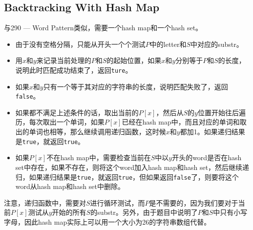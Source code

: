 \subsection{Backtracking With Hash Map}
与290 --- Word Pattern类似，需要一个hash map和一个hash set。
\begin{itemize}
\item 由于没有空格分隔，只能从开头一个个测试$P$中的letter和$S$中对应的substr。
\item 用$x$和$y$来记录当前处理的$P$和$S$的起始位置，如果$x$和$y$分别等于$P$和$S$的长度，说明此时匹配成功结束了，返回\texttt{ture}。
\item 如果$x$和$y$只有一个等于其对应的字符串的长度，说明匹配失败了，返回\texttt{false}。
\item 如果都不满足上述条件的话，取出当前的$P[x]$，然后从$S$的$y$位置开始往后遍历，每次取出一个单词，如果$P[x]$已经在hash map中，而且对应的单词和取出的单词也相等，那么继续调用递归函数，这时候$x$和$y$都加1。如果递归结果是\texttt{true}，就返回\texttt{true}。
\item 如果$P[x]$不在hash map中，需要检查当前在$S$中以$y$开头的word是否在hash set中存在，如果不存在，则将这个word加入hash
 map和hash set，然后继续递归，如果递归结果是\texttt{true}，就返回\texttt{true}，但如果返回\texttt{false}了，则要将这个word从hash map和hash set中删除。
\end{itemize}
注意，递归函数中，需要对$S$进行循环测试，而$P$是不需要的，因为我们要对于当前$P[x]$测试从$y$开始的所有$S$的substr。另外，由于题目中说明了$P$和$S$中只有小写字母，因此hash map实际上可以用一个大小为26的字符串数组代替。

